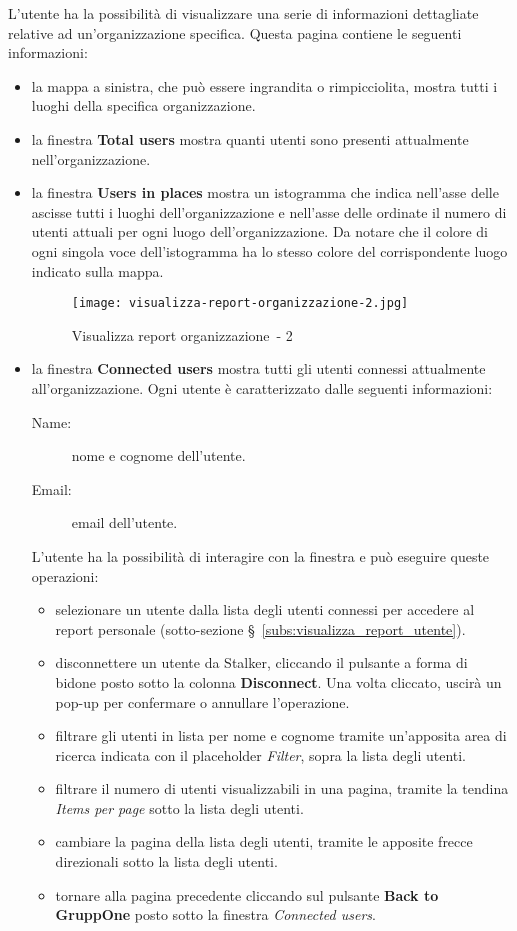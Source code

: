\documentclass[../manuale-utente.tex]{subfiles}
\begin{document}
L'utente ha la possibilità di visualizzare una serie di informazioni dettagliate relative ad un'organizzazione specifica.
Questa pagina contiene le seguenti informazioni:
\begin{itemize}
  \item la mappa a sinistra, che può essere ingrandita o rimpicciolita, mostra tutti i luoghi della specifica organizzazione.
  \item la finestra \textbf{Total users} mostra quanti utenti sono presenti attualmente nell'organizzazione.
  \item la finestra \textbf{Users in places} mostra un istogramma che indica nell'asse delle ascisse tutti i luoghi dell'organizzazione e nell'asse delle ordinate il numero di utenti attuali per ogni luogo dell'organizzazione. Da notare che il colore di ogni singola voce dell'istogramma ha lo stesso colore del corrispondente luogo indicato sulla mappa.
  \begin{figure}[H]
    \centering
    \texttt{[image: visualizza-report-organizzazione-2.jpg]}
    \caption{Visualizza report organizzazione~- 2}%
    \label{fig:web_app_visualizza-report-organizzazione-2}
  \end{figure}
  \item la finestra \textbf{Connected users} mostra tutti gli utenti connessi attualmente all'organizzazione.
  Ogni utente è caratterizzato dalle seguenti informazioni:
  \begin{description}
    \item[Name:] nome e cognome dell'utente.
    \item[Email:] email dell'utente.
  \end{description}
  L'utente ha la possibilità di interagire con la finestra e può eseguire queste operazioni:
  \begin{itemize}
    \item selezionare un utente dalla lista degli utenti connessi per accedere al report personale (sotto-sezione §~\ref{subs:visualizza_report_utente}).
    \item disconnettere un utente da Stalker, cliccando il pulsante a forma di bidone posto sotto la colonna \textbf{Disconnect}. Una volta cliccato, uscirà un pop-up per confermare o annullare l'operazione.
    \item filtrare gli utenti in lista per nome e cognome tramite un'apposita area di ricerca indicata con il placeholder \textit{Filter}, sopra la lista degli utenti.
    \item filtrare il numero di utenti visualizzabili in una pagina, tramite la tendina \textit{Items per page} sotto la lista degli utenti.
    \item cambiare la pagina della lista degli utenti, tramite le apposite frecce direzionali sotto la lista degli utenti.
    \item tornare alla pagina precedente cliccando sul pulsante \textbf{Back to GruppOne} posto sotto la finestra \textit{Connected users}.
  \end{itemize}
\end{itemize}
\end{document}
